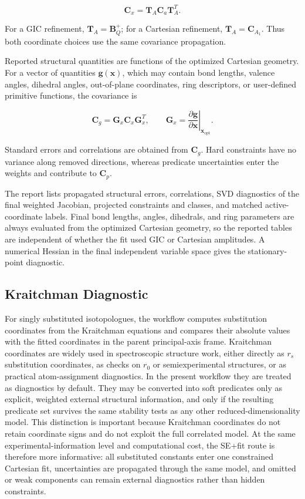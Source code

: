 \documentclass[aip,jcp,reprint,longbibliography,floatfix]{revtex4-2}
\begin{document}
\begin{equation}
\mathbf{C}_{x}
=
\mathbf{T}_{A}
\mathbf{C}_{a}
\mathbf{T}_{A}^{T}.
\end{equation}

For a GIC refinement, $\mathbf{T}_{A}=\mathbf{B}_{Q}^{+}$; for a Cartesian
refinement, $\mathbf{T}_{A}=\mathbf{C}_{A_1}$. Thus both coordinate choices use
the same covariance propagation.

Reported structural quantities are functions of the optimized Cartesian
geometry. For a vector of quantities
$\mathbf{g}(\mathbf{x})$, which may contain bond lengths, valence angles,
dihedral angles, out-of-plane coordinates, ring descriptors, or user-defined
primitive functions, the covariance is

\begin{equation}
\mathbf{C}_{g}
=
\mathbf{G}_{x}
\mathbf{C}_{x}
\mathbf{G}_{x}^{T},
\qquad
\mathbf{G}_{x}
=
\left.
\frac{\partial\mathbf{g}}
{\partial\mathbf{x}}
\right|_{\mathbf{x}_{\mathrm{opt}}}.
\end{equation}

Standard errors and correlations are obtained from $\mathbf{C}_{g}$. Hard
constraints have no variance along removed directions, whereas predicate
uncertainties enter the weights and contribute to $\mathbf{C}_{p}$.

The report lists propagated structural errors, correlations, SVD diagnostics of
the final weighted Jacobian, projected constraints and classes, and matched
active-coordinate labels. Final bond lengths, angles, dihedrals, and ring
parameters are always evaluated from the optimized Cartesian geometry, so the
reported tables are independent of whether the fit used GIC or Cartesian
amplitudes. A numerical Hessian in the final independent variable space gives
the stationary-point diagnostic.


\subsection{Kraitchman Diagnostic}

For singly substituted isotopologues, the workflow computes substitution
coordinates from the Kraitchman equations\cite{Kraitchman1953} and compares
their absolute values with the fitted coordinates in the parent principal-axis
frame. Kraitchman coordinates are widely used in spectroscopic structure work,
either directly as $r_s$ substitution coordinates, as checks on $r_0$ or
semiexperimental structures, or as practical atom-assignment diagnostics. In
the present workflow they are treated as diagnostics by default. They may be
converted into soft predicates only as explicit, weighted external structural
information, and only if the resulting predicate set survives the same
stability tests as any other reduced-dimensionality model. This distinction is
important because Kraitchman coordinates do not retain coordinate signs and do
not exploit the full correlated model. At the same experimental-information
level and computational cost, the SE+fit route is therefore more informative:
all substituted constants enter one constrained Cartesian fit, uncertainties
are propagated through the same model, and omitted or weak components can
remain external diagnostics rather than hidden constraints.
\end{document}
